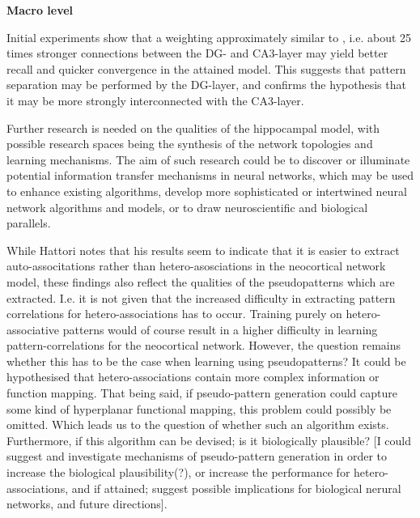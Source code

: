 


\newpage
\textbf{Macro level}

Initial experiments show that a weighting approximately similar to \citep{Wakagi2008}, i.e. about 25 times stronger connections between the DG- and CA3-layer may yield better recall and quicker convergence in the attained model. This suggests that pattern separation may be performed by the DG-layer, and confirms the hypothesis that it may be more strongly interconnected with the CA3-layer.

Further research is needed on the qualities of the hippocampal model, with possible research spaces being the synthesis of the network topologies and learning mechanisms. The aim of such research could be to discover or illuminate potential information transfer mechanisms in neural networks, which may be used to enhance existing algorithms, develop more sophisticated or intertwined neural network algorithms and models, or to draw neuroscientific and biological parallels.


While Hattori notes that his results seem to indicate that it is easier to extract auto-associtations rather than hetero-asosciations in the neocortical network model, these findings also reflect the qualities of the pseudopatterns which are extracted. I.e. it is not given that the increased difficulty in extracting pattern correlations for hetero-associations has to occur. Training purely on hetero-associative patterns would of course result in a higher difficulty in learning pattern-correlations for the neocortical network. However, the question remains whether this has to be the case when learning using pseudopatterns? It could be hypothesised that hetero-associations contain more complex information or function mapping. That being said, if pseudo-pattern generation could capture some kind of hyperplanar functional mapping, this problem could possibly be omitted. Which leads us to the question of whether such an algorithm exists. Furthermore, if this algorithm can be devised; is it biologically plausible? [I could suggest and investigate mechanisms of pseudo-pattern generation in order to increase the biological plausibility(?), or increase the performance for hetero-associations, and if attained; suggest possible implications for biological nerural networks, and future directions].

